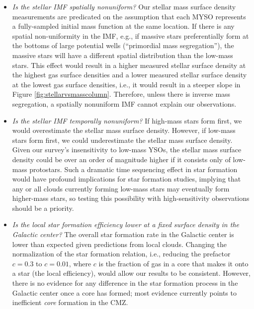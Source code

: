 \documentclass[twocolumn]{aastex61}
\begin{document}
\begin{itemize}
    \item \emph{Is the stellar IMF spatially nonuniform?}
        Our stellar mass surface density measurements are predicated on the
        assumption that each MYSO represents a fully-sampled initial mass
        function at the same location.  If there is any spatial non-uniformity
        in the IMF, e.g., if massive stars preferentially form at the bottoms
        of large potential wells (``primordial mass segregation''), the massive
        stars will have a different spatial distribution than the low-mass
        stars.  This effect would result in a higher measured stellar surface
        density at the highest gas surface densities and a lower measured
        stellar surface density at the lowest gas surface densities, i.e., it
        would result in a steeper slope in Figure
        \ref{fig:stellarvsmasscolumn}.  Therefore, unless there is inverse mass
        segregation, a spatially nonuniform IMF cannot explain our
        observations.

    \item \emph{Is the stellar IMF temporally nonuniform?}
        If high-mass stars form first, we would overestimate the stellar mass
        surface density.  However, if low-mass stars form first, we could
        underestimate the stellar mass surface density.  Given our survey's
        insensitivity to low-mass YSOs, the stellar mass surface density could
        be over an order of magnitude higher if it consists only of low-mass
        protostars.  Such a dramatic time sequencing effect in star formation
        would have profound implications for star formation studies, implying
        that any or all clouds currently forming low-mass stars may eventually
        form higher-mass stars, so testing this possibility with
        high-sensitivity observations should be a priority.

    \item \emph{Is the \emph{local} star formation efficiency lower at a fixed surface
        density in the Galactic center?}
        The overall star formation rate in the Galactic center is lower than
        expected given predictions from local clouds.  Changing the
        normalization of the star formation relation, i.e., reducing the prefactor
        $c=0.3$ to $c=0.01$, where $c$ is the fraction of gas in a core that
        makes it onto a star (the local efficiency), would allow our results to
        be consistent.  However, there is no evidence for any difference in the
        star formation process in the Galactic center once a core has formed;
        most evidence currently points to inefficient \emph{core} formation in
        the CMZ.


\end{itemize}
\end{document}
